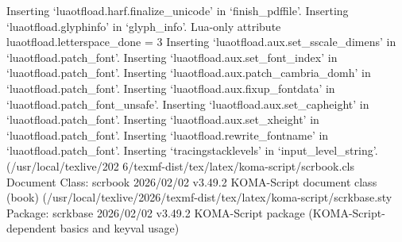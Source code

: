 \documentclass[
11pt,
a4paper,
oneside
]{scrbook}
\begin{document}
{\begin{Printout}[
	form=blue,
	paperheight=999,
	bandlines=2,
	feedlines=0,
	fitcolumns=132,
	linenumbers=true,
	punchholes=false,
	fontsize=\scriptsize
	]
Inserting `luaotfload.harf.finalize_unicode' in `finish_pdffile'.
Inserting `luaotfload.glyphinfo' in `glyph_info'.
Lua-only attribute luaotfload.letterspace_done = 3
Inserting `luaotfload.aux.set_sscale_dimens' in `luaotfload.patch_font'.
Inserting `luaotfload.aux.set_font_index' in `luaotfload.patch_font'.
Inserting `luaotfload.aux.patch_cambria_domh' in `luaotfload.patch_font'.
Inserting `luaotfload.aux.fixup_fontdata' in `luaotfload.patch_font_unsafe'.
Inserting `luaotfload.aux.set_capheight' in `luaotfload.patch_font'.
Inserting `luaotfload.aux.set_xheight' in `luaotfload.patch_font'.
Inserting `luaotfload.rewrite_fontname' in `luaotfload.patch_font'.
Inserting `tracingstacklevels' in `input_level_string'. (/usr/local/texlive/202
6/texmf-dist/tex/latex/koma-script/scrbook.cls
Document Class: scrbook 2026/02/02 v3.49.2 KOMA-Script document class (book)
(/usr/local/texlive/2026/texmf-dist/tex/latex/koma-script/scrkbase.sty
Package: scrkbase 2026/02/02 v3.49.2 KOMA-Script package (KOMA-Script-dependent
basics and keyval usage)
\end{Printout}

}
\end{document}
